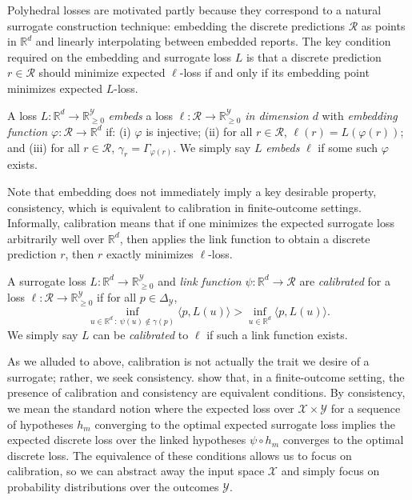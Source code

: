 \documentclass[anon]{colt2020} %
\newcommand{\reals}{\mathbb{R}}
\newcommand{\nonnegreals}{\reals_{\geq 0}}%
\newcommand{\simplex}{\Delta_\Y}
\newcommand{\R}{\mathcal{R}}
\newcommand{\X}{\mathcal{X}}
\newcommand{\Y}{\mathcal{Y}}
\newcommand{\inprod}[2]{\langle #1, #2 \rangle}%
\begin{document}
Polyhedral losses are motivated partly because they correspond to a natural surrogate construction technique: embedding the discrete predictions $\R$ as points in $\reals^d$ and linearly interpolating between embedded reports.
The key condition required on the embedding and surrogate loss $L$ is that a discrete prediction $r \in \R$ should minimize expected $\ell$-loss if and only if its embedding point minimizes expected $L$-loss.
%
\begin{definition}
  A loss $L: \reals^d \to \nonnegreals^{\Y}$ \emph{embeds} a loss $\ell: \R \to \nonnegreals^{\Y}$ \emph{in dimension $d$} with \emph{embedding function $\varphi: \R \to \reals^d$} if: (i) $\varphi$ is injective; (ii) for all $r \in \R$, $\ell(r) = L(\varphi(r))$; and (iii) for all $r \in \R$, $\gamma_r = \Gamma_{\varphi(r)}$.
  We simply say $L$ \emph{embeds} $\ell$ if some such $\varphi$ exists.
\end{definition}
%
Note that embedding does not immediately imply a key desirable property, consistency, which is equivalent to calibration in finite-outcome settings.
Informally, calibration means that if one minimizes the expected surrogate loss arbitrarily well over $\reals^d$, then applies the link function to obtain a discrete prediction $r$, then $r$ exactly minimizes $\ell$-loss.
\begin{definition}\label{def:calibration}
  A surrogate loss $L: \reals^d \to \nonnegreals^{\Y}$ and \emph{link function} $\psi: \reals^d \to \R$ are \emph{calibrated} for a loss $\ell: \R \to \nonnegreals^{\Y}$ if for all $p \in \simplex$,
    \[ \inf_{u \in \reals^d ~:~ \psi(u) \not\in \gamma(p)} \inprod{p}{L(u)}  > \inf_{u \in \reals^d} \inprod{p}{L(u)}  .\]
  We simply say $L$ can be \emph{calibrated} to $\ell$ if such a link function exists.
\end{definition}
As we alluded to above, calibration is not actually the trait we desire of a surrogate; rather, we seek consistency.
\cite{tewari2007consistency} show that, in a finite-outcome setting, the presence of calibration and consistency are equivalent conditions.
By consistency, we mean the standard notion where the expected loss over $\X \times \Y$ for a sequence of hypotheses $h_m$ converging to the optimal expected surrogate loss implies the expected discrete loss over the linked hypotheses $\psi \circ h_m$ converges to the optimal discrete loss.
The equivalence of these conditions allows us to focus on calibration, so we can abstract away the input space $\X$ and simply focus on probability distributions over the outcomes $\Y$.
\end{document}
